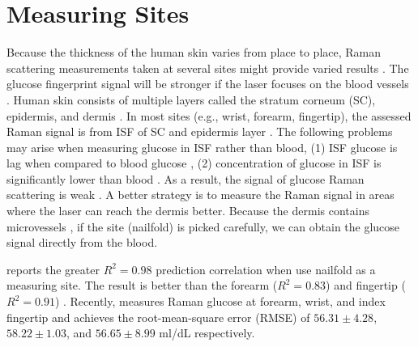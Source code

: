 
\section{Measuring Sites}

Because the thickness of the human skin varies from place to place, Raman scattering measurements taken at several sites might provide varied results \citep{ramanNailFold2019, sitecompare}.
The glucose fingerprint signal will be stronger if the laser focuses on the blood vessels \citep{solutionGlucose}.
Human skin consists of multiple layers called the stratum corneum (SC), epidermis, and dermis \citep{ramanNailFold2019}.
In most sites (e.g., wrist, forearm, fingertip), the assessed Raman signal is from ISF of SC and epidermis layer \citep{ramanNailFold2019}.
The following problems may arise when measuring glucose in ISF rather than blood, 
(1) ISF glucose is lag when compared to blood glucose \citep{bloodvsisf, isflag}, 
(2) concentration of glucose in ISF is significantly lower than blood \citep{isfconcentration}. 
As a result, the signal of glucose Raman scattering is weak \citep{ramanNailFold2019}.
A better strategy is to measure the Raman signal in areas where the laser can reach the dermis better.
Because the dermis contains microvessels \citep{microvessel-dermis, microvessel-dermis2}, if the site (nailfold) is picked carefully, we can obtain the glucose signal directly from the blood.

\cite{ramanNailFold2019} reports the greater $R^2 = 0.98$ prediction correlation when use nailfold as a measuring site.
The result is better than the forearm ($R^2 = 0.83$) \citep{forearm2005,forearm2014} and fingertip ($R^2 = 0.91$) \citep{fingertip2011}.
Recently, \cite{sitecompare} measures Raman glucose at forearm, wrist, and index fingertip and achieves the root-mean-square error (RMSE) of $56.31\pm4.28$, $58.22\pm1.03$, and $56.65\pm8.99$ ml/dL respectively.

